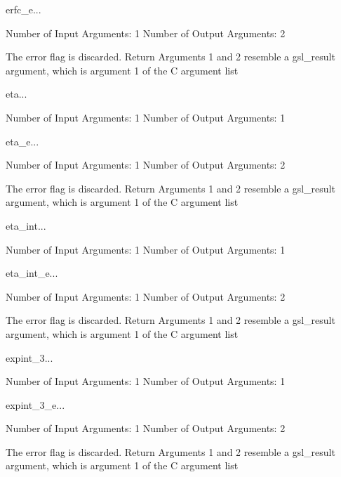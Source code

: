 \begin{funcdesc}{erfc_e}{...}

    Number of Input  Arguments:  1
    Number of Output Arguments:  2

The error flag is discarded.
Return Arguments 1 and 2 resemble a gsl_result argument,
	which is  argument 1 of the C argument list

\end{funcdesc}

\begin{funcdesc}{eta}{...}

    Number of Input  Arguments:  1
    Number of Output Arguments:  1
\end{funcdesc}

\begin{funcdesc}{eta_e}{...}

    Number of Input  Arguments:  1
    Number of Output Arguments:  2

The error flag is discarded.
Return Arguments 1 and 2 resemble a gsl_result argument,
	which is  argument 1 of the C argument list

\end{funcdesc}

\begin{funcdesc}{eta_int}{...}

    Number of Input  Arguments:  1
    Number of Output Arguments:  1
\end{funcdesc}

\begin{funcdesc}{eta_int_e}{...}

    Number of Input  Arguments:  1
    Number of Output Arguments:  2

The error flag is discarded.
Return Arguments 1 and 2 resemble a gsl_result argument,
	which is  argument 1 of the C argument list

\end{funcdesc}

\begin{funcdesc}{expint_3}{...}

    Number of Input  Arguments:  1
    Number of Output Arguments:  1
\end{funcdesc}

\begin{funcdesc}{expint_3_e}{...}

    Number of Input  Arguments:  1
    Number of Output Arguments:  2

The error flag is discarded.
Return Arguments 1 and 2 resemble a gsl_result argument,
	which is  argument 1 of the C argument list

\end{funcdesc}

